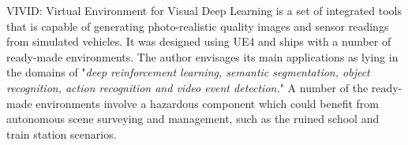 VIVID: Virtual Environment for Visual Deep Learning \cite{Lai2018ViviD:Learning} is a set of integrated tools that is capable of generating photo-realistic quality images and sensor readings from simulated vehicles. It was designed using UE4 and ships with a number of ready-made environments. The author envisages its main applications as lying in the domains of "\textit{deep reinforcement learning, semantic segmentation, object recognition, action recognition and video event detection.}" A number of the ready-made environments involve a hazardous component which could benefit from autonomous scene surveying and management, such as the ruined school and train station scenarios.












